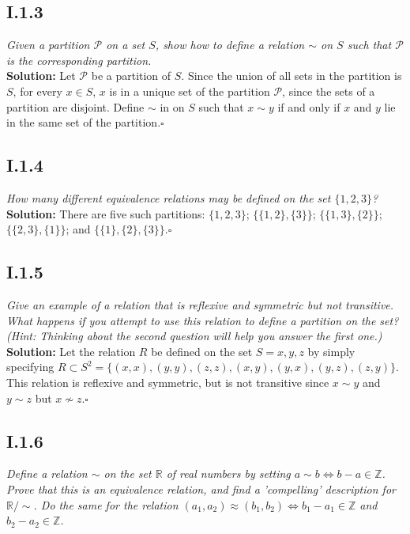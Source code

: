 \documentclass[11pt,a4paper]{article}
\begin{document}
\subsection*{I.1.3} \textit{Given a partition $\mathscr{P}$ on a set $S$, show how to define a relation $\sim$ on $S$ such that $\mathscr{P}$ is the corresponding partition.} \\

\noindent\textbf{Solution:} Let $\mathscr{P}$ be a partition of $S$. Since the union of all sets in the partition is $S$, for every $x \in S$, $x$ is in a unique set of the partition $\mathscr{P}$, since the sets of a partition are disjoint.  Define $\sim$ in on $S$ such that $x \sim y$ if and only if $x$ and $y$ lie in the same set of the partition.$\square$

\subsection*{I.1.4} \textit{How many different equivalence relations may be defined on the set $\{1,2,3\}$?} \\

\noindent\textbf{Solution:} There are five such partitions: $\{1,2,3\}$; $\{\{1,2\},\{3\}\}$; $\{\{1,3\},\{2\}\}$;$\{\{2,3\},\{1\}\}$; and $\{\{1\},\{2\},\{3\}\}$.$\square$

\subsection*{I.1.5} \textit{Give an example of a relation that is reflexive and symmetric but not transitive. What happens if you attempt to use this relation to define a partition on the set? (Hint: Thinking about the second question will help you answer the first one.)} \\

\noindent\textbf{Solution:} Let the relation $R$ be defined on the set $S = {x,y,z}$ by simply specifying $R \subset S^2 = \{(x,x),(y,y),(z,z),(x,y),(y,x),(y,z),(z,y)\}$. This relation is reflexive and symmetric, but is not transitive since $x \sim y$ and $y \sim z$ but $x \not\sim z$.$\square$

\subsection*{I.1.6} \textit{Define a relation $\sim$ on the set $\mathbb{R}$ of real numbers by setting $a \sim b \iff b-a \in \mathbb{Z}$. Prove that this is an equivalence relation, and find a 'compelling' description for $\mathbb{R}/\sim$.  Do the same for the relation $(a_1,a_2)\approx (b_1,b_2) \iff b_1 - a_1 \in \mathbb{Z}$ and ${b_2 - a_2} \in \mathbb{Z}$.} \\
\end{document}

